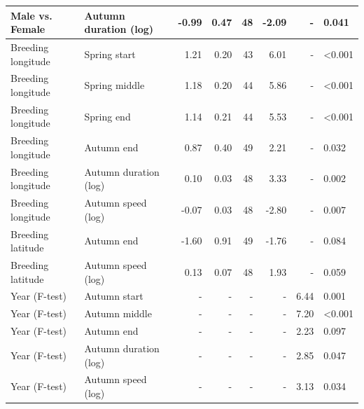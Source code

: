 \documentclass[a4paper, twoside]{templates/ociamthesis}
\begin{document}
\begin{table}[t]
\begin{tabular}{l|l|r|r|r|r|r|l}
\hline
Male vs. Female & Autumn duration (log) & -0.99 & 0.47 & 48 & -2.09 & - & 0.041\\
\hline
Breeding longitude & Spring start & 1.21 & 0.20 & 43 & 6.01 & - & <0.001\\
\hline
Breeding longitude & Spring middle & 1.18 & 0.20 & 44 & 5.86 & - & <0.001\\
\hline
Breeding longitude & Spring end & 1.14 & 0.21 & 44 & 5.53 & - & <0.001\\
\hline
Breeding longitude & Autumn end & 0.87 & 0.40 & 49 & 2.21 & - & 0.032\\
\hline
Breeding longitude & Autumn duration (log) & 0.10 & 0.03 & 48 & 3.33 & - & 0.002\\
\hline
Breeding longitude & Autumn speed (log) & -0.07 & 0.03 & 48 & -2.80 & - & 0.007\\
\hline
Breeding latitude & Autumn end & -1.60 & 0.91 & 49 & -1.76 & - & 0.084\\
\hline
Breeding latitude & Autumn speed (log) & 0.13 & 0.07 & 48 & 1.93 & - & 0.059\\
\hline
Year (F-test) & Autumn start & - & - & - & - & 6.44 & 0.001\\
\hline
Year (F-test) & Autumn middle & - & - & - & - & 7.20 & <0.001\\
\hline
Year (F-test) & Autumn end & - & - & - & - & 2.23 & 0.097\\
\hline
Year (F-test) & Autumn duration (log) & - & - & - & - & 2.85 & 0.047\\
\hline
Year (F-test) & Autumn speed (log) & - & - & - & - & 3.13 & 0.034\\
\hline
\end{tabular}
\end{table}
\end{document}
